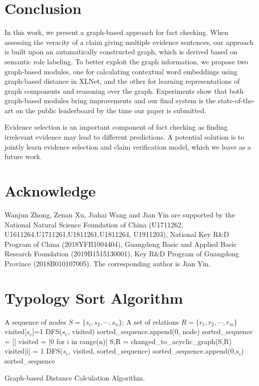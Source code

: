\documentclass[11pt,a4paper]{article}
\begin{document}
\section{Conclusion}
In this work, we present a graph-based approach for fact checking.
When assessing the veracity of a claim giving multiple evidence sentences, 
our approach is built upon an automatically constructed graph, which is derived based on semantic role labeling. 
To better exploit the graph information, we propose two graph-based modules, one for calculating contextual word embeddings using graph-based distance in XLNet, and the other for learning representations of graph components and reasoning over the graph.
Experiments show that both graph-based modules bring improvements and our final system is the state-of-the-art on the public leaderboard by the time our paper is submitted.

Evidence selection is an important component of fact checking as finding irrelevant evidence may lead to different predictions. A potential solution is to jointly learn evidence selection and claim verification model, which we leave as a future work.
\section*{Acknowledge}
Wanjun Zhong, Zenan Xu, Jiahai Wang and Jian Yin are supported by the National Natural Science Foundation of China (U1711262, U1611264,U1711261,U1811261,U1811264, U1911203), National Key R\&D Program of China (2018YFB1004404), Guangdong Basic and Applied Basic Research Foundation (2019B1515130001),  Key R\&D Program of Guangdong Province (2018B010107005).  The corresponding author is Jian Yin.


\appendix
\section{Typology Sort Algorithm}
\label{sort-algirithm}
\begin{algorithm}[h]
	\centering
	\footnotesize
	\begin{algorithmic}[1]
		\Require
		A sequence of nodes $S = \{s_i, s_2, \cdots, s_n\}$; A set of relations  $R = \{r_1, r_2, \cdots, r_m\}$
		\State
		visited[$s_c$]=1
		\State
		DFS($s_c$, visited)
		\EndIf
		\EndFor
		\State
		sorted\_sequence.append(0, node)
		\EndFunction
		\State
		sorted\_sequence = []
		\State
		visited = [0 for i in range(n)]
		\State
		S,R = changed\_to\_acyclic\_graph(S,R)
		\State
		visited[i] = 1
		\State
		DFS($s_c$, visited, sorted\_sequence)
		\EndFor
		\State
		sorted\_sequence.append(0,$s_i$)
		\EndIf
		\EndFor
		\State
		\Return sorted\_sequence
	\end{algorithmic}
	\caption{Graph-based Distance Calculation Algorithm.}
	\label{alg:training}
\end{algorithm}
\end{document}
